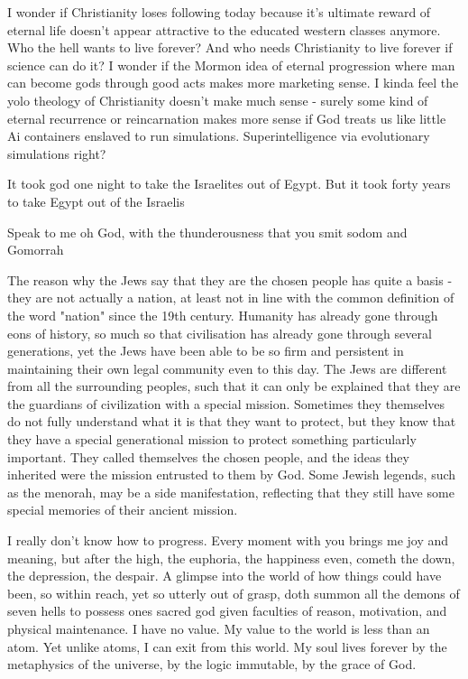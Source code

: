 I wonder if Christianity loses following today because it’s ultimate reward of eternal life doesn’t appear attractive to the educated western classes anymore. Who the hell wants to live forever? And who needs Christianity to live forever if science can do it? I wonder if the Mormon idea of eternal progression where man can become gods through good acts makes more marketing sense. I kinda feel the yolo theology of Christianity doesn’t make much sense - surely some kind of eternal recurrence or reincarnation makes more sense if God treats us like little Ai containers enslaved to run simulations. Superintelligence via evolutionary simulations right? 



It took god one night to take the Israelites out of Egypt. But it took forty years to take Egypt out of the Israelis



Speak to me oh God, with the thunderousness that you smit sodom and Gomorrah



The reason why the Jews say that they are the chosen people has quite a basis - they are not actually a nation, at least not in line with the common definition of the word "nation" since the 19th century. Humanity has already gone through eons of history, so much so that civilisation has already gone through several generations, yet the Jews have been able to be so firm and persistent in maintaining their own legal community even to this day. The Jews are different from all the surrounding peoples, such that it can only be explained that they are the guardians of civilization with a special mission. Sometimes they themselves do not fully understand what it is that they want to protect, but they know that they have a special generational mission to protect something particularly important. They called themselves the chosen people, and the ideas they inherited were the mission entrusted to them by God. Some Jewish legends, such as the menorah, may be a side manifestation, reflecting that they still have some special memories of their ancient mission. 

I really don’t know how to progress. Every moment with you brings me joy and meaning, but after the high, the euphoria, the happiness even, cometh the down, the depression, the despair. A glimpse into the world of how things could have been, so within reach, yet so utterly out of grasp, doth summon all the demons of seven hells to possess ones sacred god given faculties of reason, motivation, and physical maintenance. 
I have no value. My value to the world is less than an atom. Yet unlike atoms, I can exit from this world. My soul lives forever by the metaphysics of the universe, by the logic immutable, by the grace of God. 




